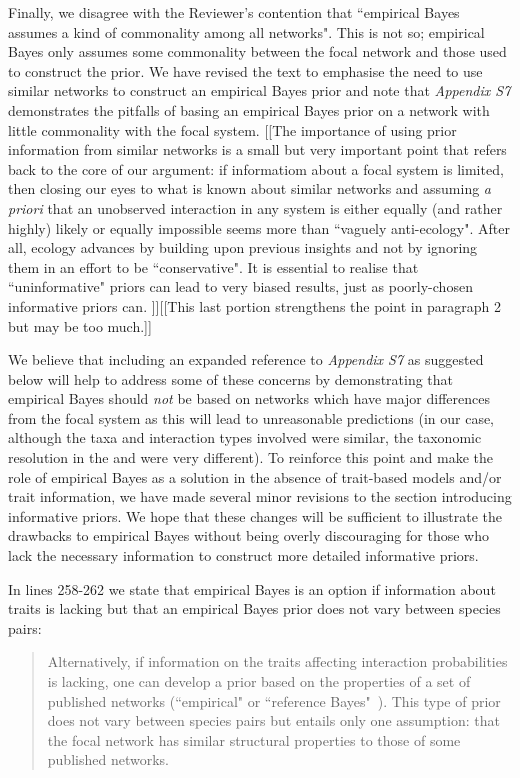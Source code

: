 \documentclass[12pt]{letter}
\begin{document}
		Finally, we disagree with the Reviewer's contention that ``empirical Bayes assumes a kind of commonality among all networks". This is not so; empirical Bayes only assumes some commonality between the focal network and those used to construct the prior. We have revised the text to emphasise the need to use similar networks to construct an empirical Bayes prior and note that \emph{Appendix S7} demonstrates the pitfalls of basing an empirical Bayes prior on a network with little commonality with the focal system. [[The importance of using prior information from similar networks is a small but very important point that refers back to the core of our argument: if informatiom about a focal system is limited, then closing our eyes to what is known about similar networks and assuming \emph{a priori} that an unobserved interaction in any system is either equally (and rather highly) likely or equally impossible seems more than ``vaguely anti-ecology". After all, ecology advances by building upon previous insights and not by ignoring them in an effort to be ``conservative". It is essential to realise that ``uninformative" priors can lead to very biased results, just as poorly-chosen informative priors can. ]][[This last portion strengthens the point in paragraph 2 but may be too much.]]


		We believe that including an expanded reference to \emph{Appendix S7} as suggested below will help to address some of these concerns by demonstrating that empirical Bayes should \emph{not} be based on networks which have major differences from the focal system as this will lead to unreasonable predictions (in our case, although the taxa and interaction types involved were similar, the taxonomic resolution in the \citet{Barbour2016} and \citet{Kopelke2017} were very different). To reinforce this point and make the role of empirical Bayes as a solution in the absence of trait-based models and/or trait information, we have made several minor revisions to the section introducing informative priors. We hope that these changes will be sufficient to illustrate the drawbacks to empirical Bayes without being overly discouraging for those who lack the necessary information to construct more detailed informative priors.


		In lines 258-262 we state that empirical Bayes is an option if information about traits is lacking but that an empirical Bayes prior does not vary between species pairs:


		\begin{quotation}

			Alternatively, if information on the traits affecting interaction probabilities is lacking, one can develop a prior based on the properties of a set of published networks (``empirical" or ``reference Bayes"~\citet{Spiegelhalter2000}). This type of prior does not vary between species pairs but entails only one assumption: that the focal network has similar structural properties to those of some published networks. 

		\end{quotation} 
\end{document}
